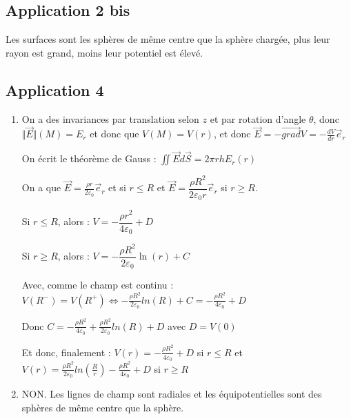 \documentclass[a4paper,12pt]{book}
\begin{document}
\subsection{Application 2 bis}
Les surfaces sont les sphères de même centre que la sphère chargée, plus leur rayon est grand, moins leur potentiel est élevé.

\subsection{Application 4}
\begin{enumerate}
\item On a des invariances par translation selon $z$ et par rotation d'angle $\theta$, donc $\Vert\vec{E}\Vert(M)=E_r$ et donc que $V(M)=V(r)$, et donc $\vec{E} =-\vec{grad}V =-\frac{dV}{dr}\vec{e}_r$
\par On écrit le théorème de Gauss : $\iint \vec{E}d\vec{S}=2\pi rhE_r(r)$
\par On a que $\vec{E}= \frac{\rho r}{2\varepsilon_0}\vec{e}_r$ et si $r\leq R$ et $\vec{E}=\dfrac{\rho R^2}{2\varepsilon_0 r}\vec{e}_r$ si $r\geq R$.
\par Si $r\leq R$, alors : $V =-\dfrac{\rho r^2}{4\varepsilon_0}+D$
\par Si $r\geq R$, alors : $V=-\dfrac{\rho R^2}{2\varepsilon_0}\ln(r)+C$
\par Avec, comme le champ est continu : $V(R^-)=V(R^+)\Leftrightarrow -\frac{\rho R^2}{2\varepsilon_0}ln(R) + C = -\frac{\rho R^2}{4\varepsilon_0}+D$
\par Donc $C = -\frac{\rho R^2}{4\varepsilon_0}+\frac{\rho R^2}{2\varepsilon_0}ln(R)+D$ avec $D=V(0)$
\par Et donc, finalement : $V(r) = -\frac{\rho R^2}{4\varepsilon_0}+D$ si $r\leq R$ et $V(r) = \frac{\rho R^2}{2\varepsilon_0}ln\left(\frac{R}{r}\right) -\frac{\rho R^2}{4\varepsilon_0}+D$ si $r\geq R$
\item NON. Les lignes de champ sont radiales et les équipotentielles sont des sphères de même centre que la sphère.
\end{enumerate}
\end{document}
